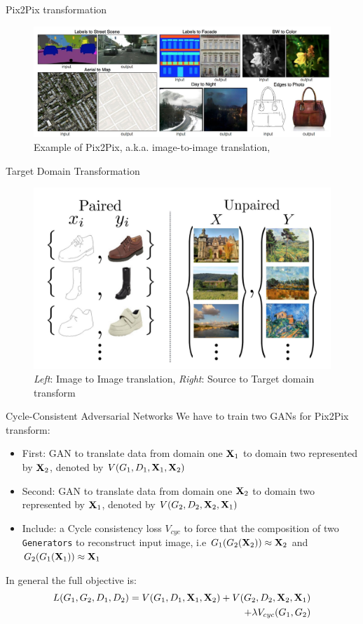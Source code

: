 \documentclass[xcolor=pdftex,dvipsnames,table,mathserif]{beamer}
\begin{document}
\begin{frame}{Pix2Pix transformation}
\begin{figure}
\includegraphics[width=.75\columnwidth]{../graphics/PixToPix}
\caption{Example of Pix2Pix, a.k.a. image-to-image translation, \cite{isola2017image}}
\end{figure}
\end{frame}

\begin{frame}{Target Domain Transformation}
\begin{figure}
\includegraphics[width=.75\columnwidth]{../graphics/PairUnPair}
\caption{ \emph{Left}:  Image to Image translation, \emph{Right}: Source to Target domain transform}
\end{figure}
\end{frame}

\begin{frame}{Cycle-Consistent Adversarial Networks}
We have to train two GANs for Pix2Pix transform:
\begin{itemize}
\item First: GAN to translate data from domain one $\mathbf{X}_1$ to domain two represented by $\mathbf{X}_2$, denoted by $V(G_1,D_1,\mathbf{X}_1,\mathbf{X}_2)$
\item Second: GAN to translate data from domain one $\mathbf{X}_2$ to domain two represented by $\mathbf{X}_1$, denoted by $V(G_2,D_2,\mathbf{X}_2,\mathbf{X}_1)$
\pause
\item Include: a Cycle consistency loss $V_{cyc}$ to force that the composition of two \texttt{Generators} to reconstruct input image, i.e $G_1(G_2(\mathbf{X}_2))\approx\mathbf{X}_2$ and  $G_2(G_1(\mathbf{X}_1))\approx\mathbf{X}_1$
\end{itemize}
In general the full objective is:
\begin{eqnarray*}
L(G_1,G_2,D_1,D_2)=V(G_1,D_1,\mathbf{X}_1,\mathbf{X}_2)+V(G_2,D_2,\mathbf{X}_2,\mathbf{X}_1)\\
+\lambda V_{cyc}(G_1,G_2)
\end{eqnarray*}
\end{frame}
\end{document}
